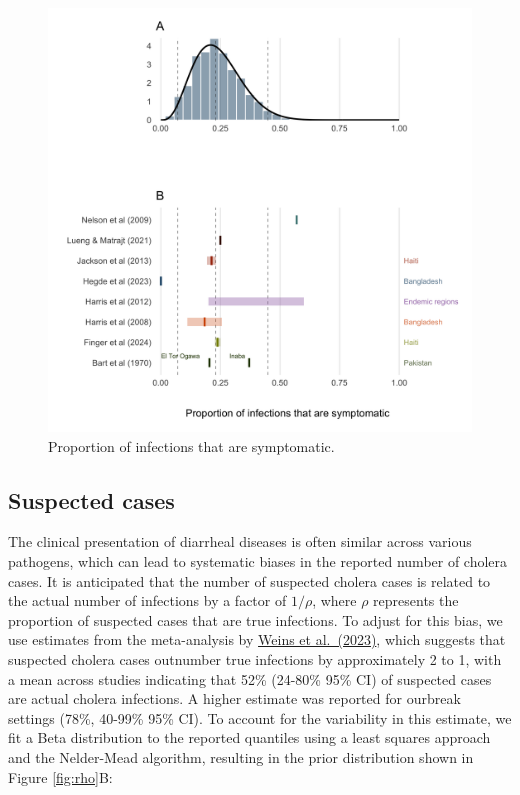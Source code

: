 \documentclass[
]{book}
\begin{document}
\begin{figure}

\includegraphics[width=1.03\linewidth]{figures/proportion_symptomatic} \hfill{}

\caption{Proportion of infections that are symptomatic.}\label{fig:symptomatic-fig}
\end{figure}

\subsection{Suspected cases}\label{suspected-cases}

The clinical presentation of diarrheal diseases is often similar across various pathogens, which can lead to systematic biases in the reported number of cholera cases. It is anticipated that the number of suspected cholera cases is related to the actual number of infections by a factor of \(1/\rho\), where \(\rho\) represents the proportion of suspected cases that are true infections. To adjust for this bias, we use estimates from the meta-analysis by \href{https://journals.plos.org/plosmedicine/article?id=10.1371/journal.pmed.1004286}{Weins et al.~(2023)}, which suggests that suspected cholera cases outnumber true infections by approximately 2 to 1, with a mean across studies indicating that 52\% (24-80\% 95\% CI) of suspected cases are actual cholera infections. A higher estimate was reported for ourbreak settings (78\%, 40-99\% 95\% CI). To account for the variability in this estimate, we fit a Beta distribution to the reported quantiles using a least squares approach and the Nelder-Mead algorithm, resulting in the prior distribution shown in Figure \ref{fig:rho}B:
\end{document}
